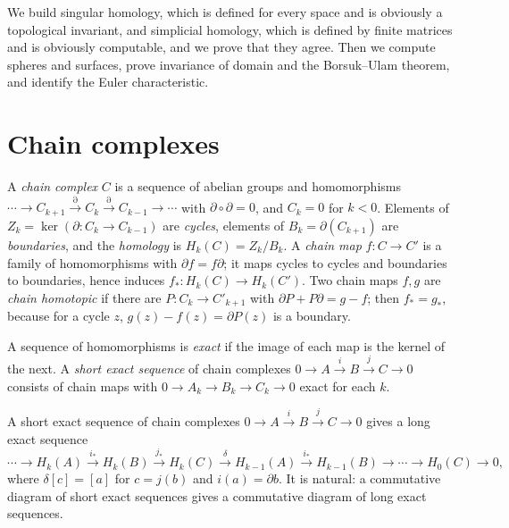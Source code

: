 We build singular homology, which is defined for every space and is obviously a topological invariant, and simplicial homology, which is defined by
finite matrices and is obviously computable, and we prove that they agree. Then we compute spheres and surfaces, prove invariance of domain and the
Borsuk--Ulam theorem, and identify the Euler characteristic.

\section{Chain complexes}

\begin{definition}
A \emph{chain complex} $C$ is a sequence of abelian groups and homomorphisms $\cdots\to C_{k+1}\xrightarrow{\partial}C_k\xrightarrow{\partial}C_{k-1}\to\cdots$ with $\partial\circ\partial=0$, and $C_k=0$ for $k<0$.
Elements of $Z_k=\ker(\partial\colon C_k\to C_{k-1})$ are \emph{cycles}, elements of $B_k=\partial(C_{k+1})$ are \emph{boundaries}, and the \emph{homology} is $H_k(C)=Z_k/B_k$. A \emph{chain map}
$f\colon C\to C'$ is a family of homomorphisms with $\partial f=f\partial$; it maps cycles to cycles and boundaries to boundaries, hence induces $f_*\colon H_k(C)\to H_k(C')$. Two chain maps
$f,g$ are \emph{chain homotopic} if there are $P\colon C_k\to C'_{k+1}$ with $\partial P+P\partial=g-f$; then $f_*=g_*$, because for a cycle $z$, $g(z)-f(z)=\partial P(z)$ is a boundary.
\end{definition}

A sequence of homomorphisms is \emph{exact} if the image of each map is the kernel of the next. A \emph{short exact sequence} of chain complexes $0\to A\xrightarrow{i}B\xrightarrow{j}C\to0$ consists of chain
maps with $0\to A_k\to B_k\to C_k\to0$ exact for each $k$.

\begin{lemma}\label{lem:zigzag}
A short exact sequence of chain complexes $0\to A\xrightarrow iB\xrightarrow jC\to0$ gives a long exact sequence
\[\cdots\to H_k(A)\xrightarrow{i_*}H_k(B)\xrightarrow{j_*}H_k(C)\xrightarrow{\delta}H_{k-1}(A)\xrightarrow{i_*}H_{k-1}(B)\to\cdots\to H_0(C)\to0,\]
where $\delta[c]=[a]$ for $c=j(b)$ and $i(a)=\partial b$. It is natural: a commutative diagram of short exact sequences gives a commutative diagram of long exact sequences.
\end{lemma}

